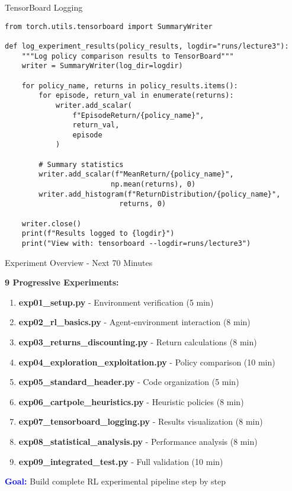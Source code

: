 \documentclass[aspectratio=169,10pt]{beamer}
\begin{document}
\begin{frame}[fragile]{TensorBoard Logging}

\begin{lstlisting}
from torch.utils.tensorboard import SummaryWriter

def log_experiment_results(policy_results, logdir="runs/lecture3"):
    """Log policy comparison results to TensorBoard"""
    writer = SummaryWriter(log_dir=logdir)
    
    for policy_name, returns in policy_results.items():
        for episode, return_val in enumerate(returns):
            writer.add_scalar(
                f"EpisodeReturn/{policy_name}", 
                return_val, 
                episode
            )
        
        # Summary statistics
        writer.add_scalar(f"MeanReturn/{policy_name}", 
                         np.mean(returns), 0)
        writer.add_histogram(f"ReturnDistribution/{policy_name}",
                           returns, 0)
    
    writer.close()
    print(f"Results logged to {logdir}")
    print("View with: tensorboard --logdir=runs/lecture3")
\end{lstlisting}

\end{frame}


\begin{frame}{Experiment Overview - Next 70 Minutes}

\textbf{9 Progressive Experiments:}

\begin{enumerate}
    \item \textbf{exp01\_setup.py} - Environment verification (5 min)
    \item \textbf{exp02\_rl\_basics.py} - Agent-environment interaction (8 min)
    \item \textbf{exp03\_returns\_discounting.py} - Return calculations (8 min)
    \item \textbf{exp04\_exploration\_exploitation.py} - Policy comparison (10 min)
    \item \textbf{exp05\_standard\_header.py} - Code organization (5 min)
    \item \textbf{exp06\_cartpole\_heuristics.py} - Heuristic policies (8 min)
    \item \textbf{exp07\_tensorboard\_logging.py} - Results visualization (8 min)
    \item \textbf{exp08\_statistical\_analysis.py} - Performance analysis (8 min)
    \item \textbf{exp09\_integrated\_test.py} - Full validation (10 min)
\end{enumerate}

\vfill

\textcolor{blue}{\textbf{Goal:}} Build complete RL experimental pipeline step by step

\end{frame}
\end{document}
